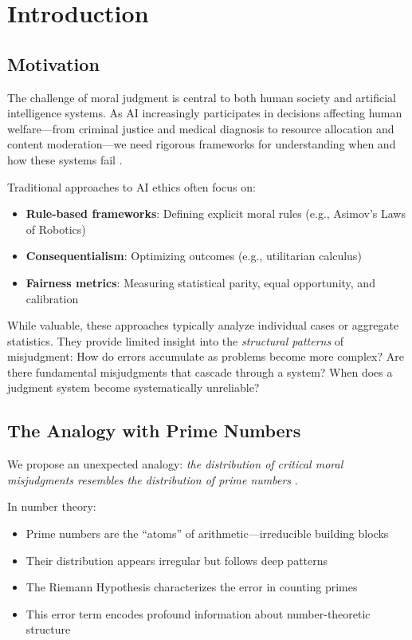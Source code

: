 \documentclass[12pt,a4paper]{article}
\theoremstyle{definition}
\theoremstyle{remark}
\begin{document}
\section{Introduction}
\label{sec:introduction}

\subsection{Motivation}

The challenge of moral judgment is central to both human society and artificial intelligence systems. As AI increasingly participates in decisions affecting human welfare---from criminal justice and medical diagnosis to resource allocation and content moderation---we need rigorous frameworks for understanding when and how these systems fail \citep{jobin2019,floridi2018}.

Traditional approaches to AI ethics often focus on:
\begin{itemize}
    \item \textbf{Rule-based frameworks}: Defining explicit moral rules (e.g., Asimov's Laws of Robotics)
    \item \textbf{Consequentialism}: Optimizing outcomes (e.g., utilitarian calculus)
    \item \textbf{Fairness metrics}: Measuring statistical parity, equal opportunity, and calibration \citep{hardt2016,dwork2012}
\end{itemize}

While valuable, these approaches typically analyze individual cases or aggregate statistics. They provide limited insight into the \emph{structural patterns} of misjudgment: How do errors accumulate as problems become more complex? Are there fundamental misjudgments that cascade through a system? When does a judgment system become systematically unreliable?

\subsection{The Analogy with Prime Numbers}

We propose an unexpected analogy: \emph{the distribution of critical moral misjudgments resembles the distribution of prime numbers} \citep{riemann1859,edwards1974}.

In number theory:
\begin{itemize}
    \item Prime numbers are the ``atoms'' of arithmetic---irreducible building blocks
    \item Their distribution appears irregular but follows deep patterns
    \item The Riemann Hypothesis characterizes the error in counting primes
    \item This error term encodes profound information about number-theoretic structure
\end{itemize}
\end{document}
